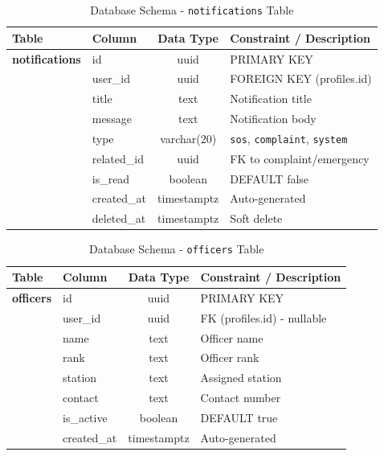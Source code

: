 \documentclass[12pt, a4paper, twoside, openany]{report}
\begin{document}
\begin{table}[ht]
\centering
\caption{Database Schema - \texttt{notifications} Table}
\label{tab:notifications}
\begin{tabularx}{\textwidth}{p{3cm} p{3cm} c X}
\toprule
\textbf{Table} & \textbf{Column} & \textbf{Data Type} & \textbf{Constraint / Description} \\
\midrule
\textbf{notifications} & id & uuid & PRIMARY KEY \\
& user\_id & uuid & FOREIGN KEY (profiles.id) \\
& title & text & Notification title \\
& message & text & Notification body \\
& type & varchar(20) & \texttt{sos}, \texttt{complaint}, \texttt{system} \\
& related\_id & uuid & FK to complaint/emergency \\
& is\_read & boolean & DEFAULT false \\
& created\_at & timestamptz & Auto-generated \\
& deleted\_at & timestamptz & Soft delete \\
\bottomrule
\end{tabularx}
\end{table}

\begin{table}[ht]
\centering
\caption{Database Schema - \texttt{officers} Table}
\label{tab:officers}
\begin{tabularx}{\textwidth}{p{3cm} p{3cm} c X}
\toprule
\textbf{Table} & \textbf{Column} & \textbf{Data Type} & \textbf{Constraint / Description} \\
\midrule
\textbf{officers} & id & uuid & PRIMARY KEY \\
& user\_id & uuid & FK (profiles.id) - nullable \\
& name & text & Officer name \\
& rank & text & Officer rank \\
& station & text & Assigned station \\
& contact & text & Contact number \\
& is\_active & boolean & DEFAULT true \\
& created\_at & timestamptz & Auto-generated \\
\bottomrule
\end{tabularx}
\end{table}
\end{document}
